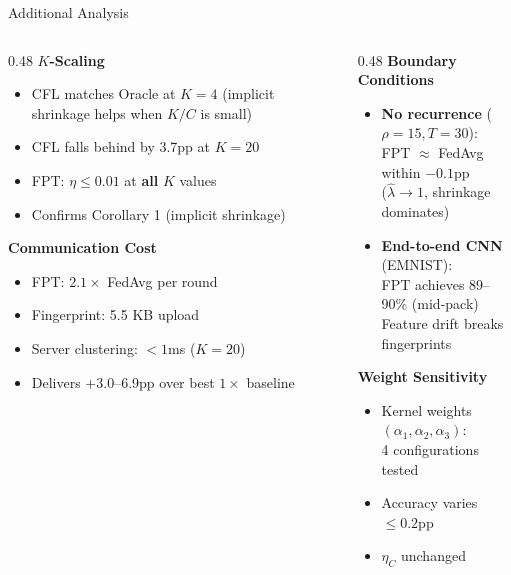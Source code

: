 \documentclass[aspectratio=169,11pt]{beamer}
\begin{document}
\begin{frame}{Additional Analysis}

\begin{columns}[T]
\begin{column}{0.48\textwidth}
\textbf{$K$-Scaling}
\begin{itemize}
  \item CFL matches Oracle at $K{=}4$ (implicit shrinkage helps when $K/C$ is small)
  \item CFL falls behind by 3.7pp at $K{=}20$
  \item FPT: $\eta \leq 0.01$ at \textbf{all} $K$ values
  \item Confirms Corollary 1 (implicit shrinkage)
\end{itemize}

\vspace{8pt}
\textbf{Communication Cost}
\begin{itemize}
  \item FPT: $2.1\times$ FedAvg per round
  \item Fingerprint: 5.5 KB upload
  \item Server clustering: $<1$ms ($K{=}20$)
  \item Delivers +3.0--6.9pp over best $1\times$ baseline
\end{itemize}
\end{column}

\begin{column}{0.48\textwidth}
\textbf{Boundary Conditions}
\begin{itemize}
  \item \textbf{No recurrence} ($\rho{=}15, T{=}30$):\\
    FPT $\approx$ FedAvg within $-0.1$pp\\
    ($\hat\lambda \to 1$, shrinkage dominates)
  \item \textbf{End-to-end CNN} (EMNIST):\\
    FPT achieves 89--90\% (mid-pack)\\
    Feature drift breaks fingerprints
\end{itemize}

\vspace{8pt}
\textbf{Weight Sensitivity}
\begin{itemize}
  \item Kernel weights $(\alpha_1, \alpha_2, \alpha_3)$:\\
    4 configurations tested
  \item Accuracy varies $\leq 0.2$pp
  \item $\eta_C$ unchanged
\end{itemize}
\end{column}
\end{columns}
\end{frame}
\end{document}
